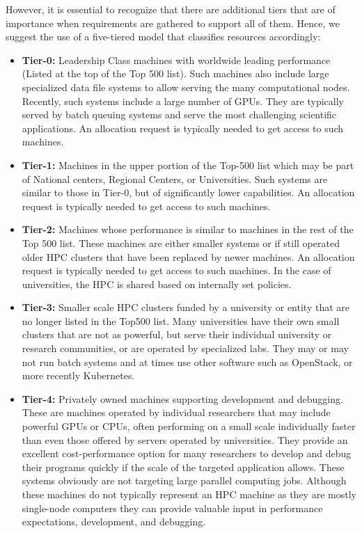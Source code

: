 \documentclass[sigconf]{acmart}
\begin{document}
However, it is essential to recognize that there are additional tiers that are of importance when requirements are gathered to support all of them. Hence, we suggest the use of a five-tiered model that classifies resources accordingly:

\begin{itemize}
\item {\bf Tier-0:} Leadership Class machines with worldwide leading
  performance (Listed at the top of the Top 500 list). Such machines also include large specialized data file systems to allow serving the many computational nodes. Recently, such systems include a large number of GPUs. They are typically served by batch queuing systems and serve the most challenging scientific applications. An allocation request is typically needed to get access to such machines.
\item {\bf Tier-1:} Machines in the upper portion of the Top-500 list which may be part of National centers, Regional Centers, or Universities. Such systems are similar to those in Tier-0, but of significantly lower capabilities.
An allocation request is typically needed to get access to such machines.
\item {\bf Tier-2:} Machines whose performance is similar to machines
  in the rest of the Top 500 list. These machines are either smaller systems or if still operated older HPC clusters that have been replaced by newer machines.
  An allocation request is typically needed to get access to such machines. In the case of universities, the HPC is shared based on internally set policies.
\item {\bf Tier-3:} Smaller scale HPC clusters funded by a university or entity
  that are no longer listed in the Top500 list. Many universities have their own small clusters that are not as powerful, but serve their individual university or research communities, or are operated by specialized  labs. They may or may not run batch systems and at times use other software such as OpenStack, or more recently Kubernetes. 
\item {\bf Tier-4:} Privately owned machines supporting development
  and debugging. These are machines operated by individual researchers that may include powerful GPUs or CPUs, often performing on a small scale individually faster than even those offered by servers operated by universities. They provide an excellent cost-performance option for many researchers to develop and debug their programs quickly if the scale of the targeted application allows. These systems obviously are not targeting large parallel computing jobs. Although these machines do not typically represent an HPC machine as they are mostly single-node computers they can provide valuable input in performance expectations, development, and debugging.
\end{itemize}
\end{document}

